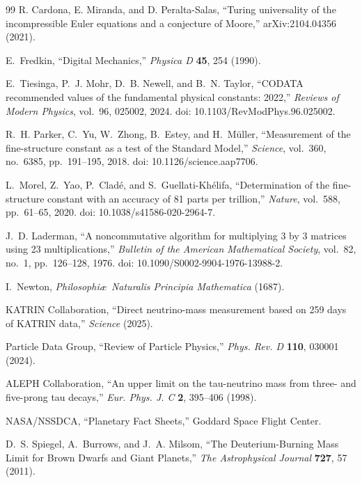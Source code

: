 \documentclass[11pt,a4paper]{article}
\begin{document}
\begin{thebibliography}{99}
R. Cardona, E. Miranda, and D. Peralta-Salas, ``Turing universality of the incompressible Euler equations and a conjecture of Moore,'' arXiv:2104.04356 (2021).

E.~Fredkin,
``Digital Mechanics,''
\textit{Physica D} \textbf{45}, 254 (1990).

E.~Tiesinga, P.~J. Mohr, D.~B. Newell, and B.~N. Taylor,
``CODATA recommended values of the fundamental physical constants: 2022,''
\emph{Reviews of Modern Physics},
vol.~96, 025002, 2024.
doi: 10.1103/RevModPhys.96.025002.

R.~H. Parker, C.~Yu, W.~Zhong, B.~Estey, and H.~M{\"u}ller,
``Measurement of the fine-structure constant as a test of the Standard Model,''
\emph{Science},
vol.~360, no.~6385, pp.~191--195, 2018.
doi: 10.1126/science.aap7706.

L.~Morel, Z.~Yao, P.~Clad{\'e}, and S.~Guellati-Kh{\'e}lifa,
``Determination of the fine-structure constant with an accuracy of
81 parts per trillion,''
\emph{Nature},
vol.~588, pp.~61--65, 2020.
doi: 10.1038/s41586-020-2964-7.

J.~D. Laderman,
``A noncommutative algorithm for multiplying 3 by 3 matrices using 23 multiplications,''
\emph{Bulletin of the American Mathematical Society},
vol.~82, no.~1, pp.~126--128, 1976.
doi: 10.1090/S0002-9904-1976-13988-2.

I.~Newton,
\textit{Philosophi\ae\ Naturalis Principia Mathematica}
(1687).

KATRIN Collaboration,
``Direct neutrino-mass measurement based on 259 days of KATRIN data,''
\textit{Science} (2025).

Particle Data Group,
``Review of Particle Physics,''
\textit{Phys. Rev. D} \textbf{110}, 030001 (2024).

ALEPH Collaboration,
``An upper limit on the tau-neutrino mass from three- and five-prong tau
decays,'' \textit{Eur. Phys. J. C} \textbf{2}, 395--406 (1998).

NASA/NSSDCA,
``Planetary Fact Sheets,''
Goddard Space Flight Center.

D.~S. Spiegel, A.~Burrows, and J.~A. Milsom,
``The Deuterium-Burning Mass Limit for Brown Dwarfs and Giant Planets,''
\textit{The Astrophysical Journal} \textbf{727}, 57 (2011).


\end{thebibliography}
\end{document}

